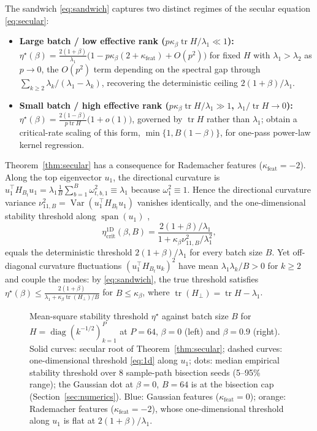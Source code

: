 \documentclass[11pt]{article}
\theoremstyle{remark}
\newcommand{\Var}{\operatorname{Var}}
\newcommand{\tr}{\operatorname{tr}}
\begin{document}
The sandwich \eqref{eq:sandwich} captures two distinct regimes of the secular equation \eqref{eq:secular}:
\begin{itemize}
\item \textbf{Large batch / low effective rank ($p\kappa_\beta\tr H/\lambda_1 \ll 1$):} $\eta^\star(\beta) = \frac{2(1+\beta)}{\lambda_1}\big(1 - p\kappa_\beta(2+\kappa_{\mathrm{feat}}) + O(p^2)\big)$ for fixed $H$ with $\lambda_1 > \lambda_2$ as $p\to0$, the $O(p^2)$ term depending on the spectral gap through $\sum_{k\ge2}\lambda_k/(\lambda_1-\lambda_k)$, recovering the deterministic ceiling $2(1+\beta)/\lambda_1$.
\item \textbf{Small batch / high effective rank ($p\kappa_\beta\tr H/\lambda_1 \gg 1$, $\lambda_1/\tr H \to 0$):} $\eta^\star(\beta) = \frac{2(1-\beta)}{p\tr H}\big(1 + o(1)\big)$, governed by $\tr H$ rather than $\lambda_1$; \citet{wang2026momentum} obtain a critical-rate scaling of this form, $\min\{1,B(1-\beta)\}$, for one-pass power-law kernel regression.
\end{itemize}

Theorem~\ref{thm:secular} has a consequence for Rademacher features ($\kappa_{\mathrm{feat}} = -2$). Along the top eigenvector $u_1$, the directional curvature is $u_1^\top H_{B_t} u_1 = \lambda_1 \frac{1}{B}\sum_{b=1}^B \omega_{t,b,1}^2 \equiv \lambda_1$ because $\omega_1^2 \equiv 1$. Hence the directional curvature variance $\nu_{11,B}^2 = \Var(u_1^\top H_{B_t} u_1)$ vanishes identically, and the one-dimensional stability threshold along $\operatorname{span}(u_1)$ \citep{wu2018sgd,andreyev2026momentum},
\begin{equation}\label{eq:1d}
\eta_{\mathrm{crit}}^{\mathrm{1D}}(\beta, B) = \frac{2(1+\beta)/\lambda_1}{1 + \kappa_\beta \nu_{11,B}^2/\lambda_1^2},
\end{equation}
equals the deterministic threshold $2(1+\beta)/\lambda_1$ for every batch size $B$. Yet off-diagonal curvature fluctuations $(u_1^\top H_{B_t} u_k)^2$ have mean $\lambda_1\lambda_k/B > 0$ for $k \ge 2$ and couple the modes: by \eqref{eq:sandwich}, the true threshold satisfies $\eta^\star(\beta) \le \frac{2(1+\beta)}{\lambda_1 + \kappa_\beta\tr(H_\perp)/B}$ for $B \le \kappa_\beta$, where $\tr(H_\perp) = \tr H - \lambda_1$.

\begin{figure}[!ht]
\centering
\resizebox{0.74\textwidth}{!}{}
\caption{Mean-square stability threshold $\eta^\star$ against batch size $B$ for $H = \operatorname{diag}(k^{-1/2})_{k=1}^P$ at $P=64$, $\beta=0$ (left) and $\beta=0.9$ (right). Solid curves: secular root of Theorem~\ref{thm:secular}; dashed curves: one-dimensional threshold \eqref{eq:1d} along $u_1$; dots: median empirical stability threshold over 8 sample-path bisection seeds (5--95\% range); the Gaussian dot at $\beta=0$, $B=64$ is at the bisection cap (Section~\ref{sec:numerics}). Blue: Gaussian features ($\kappa_{\mathrm{feat}}=0$); orange: Rademacher features ($\kappa_{\mathrm{feat}}=-2$), whose one-dimensional threshold along $u_1$ is flat at $2(1+\beta)/\lambda_1$.}
\label{fig:phase1}
\end{figure}
\end{document}
